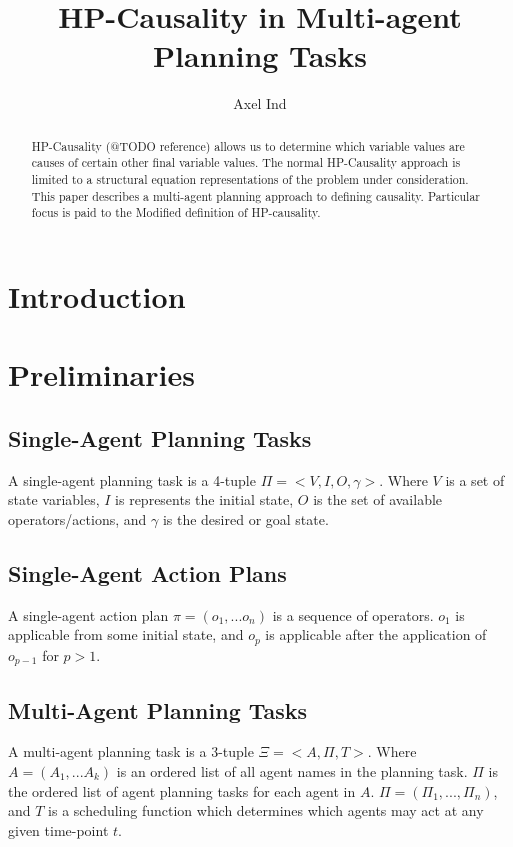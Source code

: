 \documentclass{article}
\theoremstyle{plain}
\theoremstyle{definition}
\begin{document}
\title{HP-Causality in Multi-agent Planning Tasks}
\author{Axel Ind}

\maketitle

\begin{abstract}
HP-Causality (@TODO reference) allows us to determine which variable values are causes of certain other final variable values. The normal HP-Causality approach is limited to a structural equation representations of the problem under consideration. This paper describes a multi-agent planning approach to defining causality. Particular focus is paid to the Modified definition of HP-causality.
\end{abstract}

\section{Introduction}

\section{Preliminaries}
\subsection{Single-Agent Planning Tasks}
A single-agent planning task is a 4-tuple $\Pi = <V,I,O,\gamma>$. Where $V$ is a set of state variables, $I$ is represents the initial state, $O$ is the set of available operators/actions, and $\gamma$ is the desired or goal state.

\subsection{Single-Agent Action Plans}
A single-agent action plan $\pi=(o_1,...o_n)$ is a sequence of operators. $o_1$ is applicable from some initial state, and $o_p$ is applicable after the application of $o_{p-1}$ for $p>1$.

\subsection{Multi-Agent Planning Tasks}
A multi-agent planning task is a 3-tuple $\Xi=<A, \Pi, T>$. Where $A=(A_1,...A_k)$ is an ordered list of all agent names in the planning task. $\Pi$ is the ordered list of agent planning tasks for each agent in $A$. $\Pi=(\Pi_1,...,\Pi_n)$, and $T$ is a scheduling function which determines which agents may act at any given time-point $t$.
\end{document}
